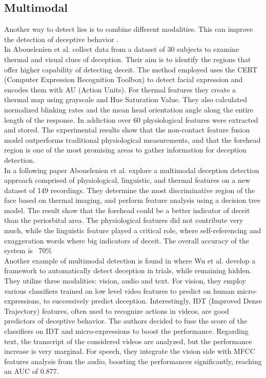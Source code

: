 \subsection*{Multimodal}
Another way to detect lies is to combine different modalities. This can improve the detection of deceptive behavior \cite{Abouelenien:2014:DDU:2663204.2663229}. \\
In \cite{Abouelenien:2016:ATV:2910674.2910682} Abouelenien et al. collect data from a dataset of 30 subjects to examine thermal and visual clues of deception. Their aim is to identify the regions that offer higher capability of detecting deceit. The method employed uses the CERT (Computer Expression Recognition Toolbox) to detect facial expression and encodes them with AU (Action Units). For thermal features they create a thermal map using grayscale and Hue Saturation Value. They also calculated normalized blinking rates and the mean head orientation angle along the entire length of the response. In addiction over 60 physiological features were extracted and stored. The experimental results show that the non-contact feature fusion model outperforms traditional physiological measurements, and that the forehead region is one of the most promising areas to gather information for deception detection.\\
In a following paper \cite{7782429} Abouelenien et al. explore a multimodal deception detection approach comprised of physiological, linguistic, and thermal features on a new dataset of 149 recordings. They determine the most discriminative region of the face based on thermal imaging, and perform feature analysis using a decision tree model. The result show that the forehead could be a better indicator of deceit than the periorbital area. The physiological features did not contribute very much, while the linguistic feature played a critical role, where self-referencing and exaggeration words where big indicators of deceit. The overall accuracy of the system is ~70\%\\
Another example of multimodal detection is found in \cite{DBLP:journals/corr/abs-1712-04415} where Wu et al. develop a framework to automatically detect deception in trials, while remaining hidden. They utilize three modalities: vision, audio and text. For vision, they employ various classifiers trained on low level video features to predict on human micro-expressions, to successively predict deception. Interestingly, IDT (Improved Dense Trajectory) features, often used to recognize actions in videos, are good predictors of deceptive behavior. The authors decided to fuse the score of the classifiers on IDT and micro-expressions to boost the performance. Regarding text, the transcript of the considered videos are analyzed, but the performance increase is very marginal. For speech, they integrate the vision side with MFCC features analysis from the audio, boosting the performances significantly, reaching an AUC of 0.877. \\
